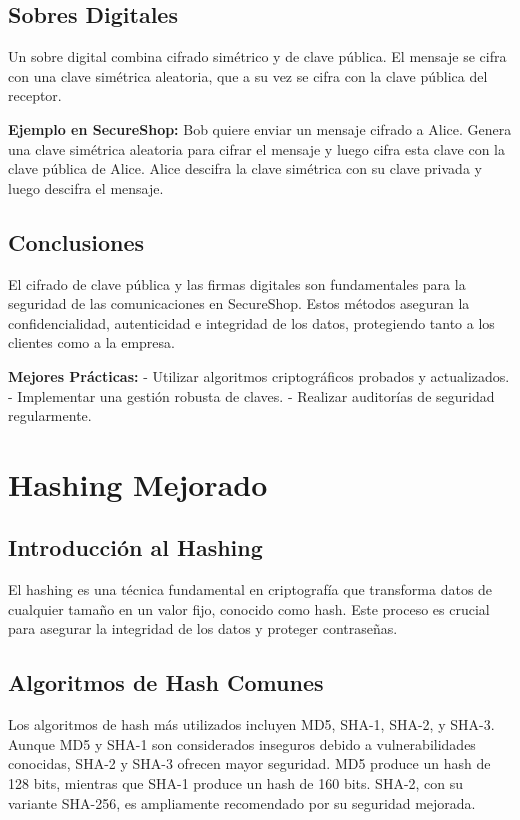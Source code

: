 \subsection{Sobres Digitales}

Un sobre digital combina cifrado simétrico y de clave pública. El mensaje se cifra con una clave simétrica aleatoria, que a su vez se cifra con la clave pública del receptor.

\textbf{Ejemplo en SecureShop:} Bob quiere enviar un mensaje cifrado a Alice. Genera una clave simétrica aleatoria para cifrar el mensaje y luego cifra esta clave con la clave pública de Alice. Alice descifra la clave simétrica con su clave privada y luego descifra el mensaje.

\subsection{Conclusiones}

El cifrado de clave pública y las firmas digitales son fundamentales para la seguridad de las comunicaciones en SecureShop. Estos métodos aseguran la confidencialidad, autenticidad e integridad de los datos, protegiendo tanto a los clientes como a la empresa.

\textbf{Mejores Prácticas:}
- Utilizar algoritmos criptográficos probados y actualizados.
- Implementar una gestión robusta de claves.
- Realizar auditorías de seguridad regularmente.

\section{Hashing Mejorado}

\subsection{Introducción al Hashing}
El hashing es una técnica fundamental en criptografía que transforma datos de cualquier tamaño en un valor fijo, conocido como hash. Este proceso es crucial para asegurar la integridad de los datos y proteger contraseñas.

\subsection{Algoritmos de Hash Comunes}
Los algoritmos de hash más utilizados incluyen MD5, SHA-1, SHA-2, y SHA-3. Aunque MD5 y SHA-1 son considerados inseguros debido a vulnerabilidades conocidas, SHA-2 y SHA-3 ofrecen mayor seguridad. MD5 produce un hash de 128 bits, mientras que SHA-1 produce un hash de 160 bits. SHA-2, con su variante SHA-256, es ampliamente recomendado por su seguridad mejorada.

